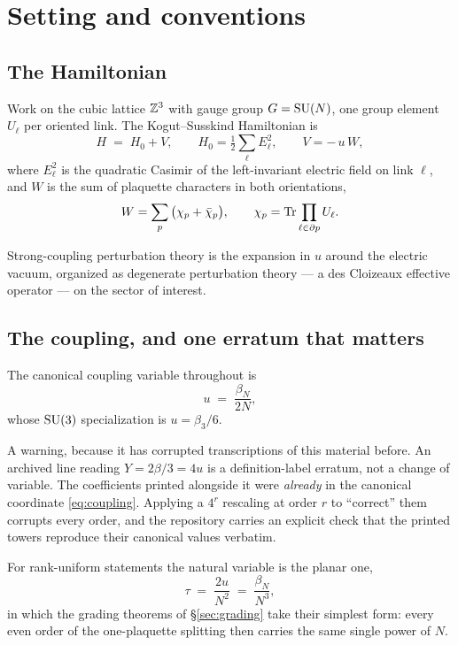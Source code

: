 \section{Setting and conventions}
\label{sec:setting}

\subsection{The Hamiltonian}

Work on the cubic lattice $\mathbb{Z}^3$ with gauge group $G = \mathrm{SU}(N)$, one
group element $U_\ell$ per oriented link. The Kogut--Susskind
Hamiltonian is
\begin{equation}
  H \;=\; H_0 + V,
  \qquad
  H_0 = \tfrac12 \sum_{\ell} E_\ell^2,
  \qquad
  V = -\,u\, W,
  \label{eq:KS}
\end{equation}
where $E_\ell^2$ is the quadratic Casimir of the left-invariant electric
field on link $\ell$, and $W$ is the sum of plaquette characters in both
orientations,
\begin{equation}
  W = \sum_{p} \big(\chi_p + \bar\chi_p\big),
  \qquad
  \chi_p = \operatorname{Tr} \prod_{\ell \in \partial p} U_\ell .
\end{equation}

Strong-coupling perturbation theory is the expansion in $u$ around the
electric vacuum, organized as degenerate perturbation theory --- a des
Cloizeaux effective operator --- on the sector of interest.

\subsection{The coupling, and one erratum that matters}

The canonical coupling variable throughout is
\begin{equation}
  u \;=\; \frac{\beta_N}{2N},
  \label{eq:coupling}
\end{equation}
whose $\mathrm{SU}(3)$ specialization is $u = \beta_3/6$.

A warning, because it has corrupted transcriptions of this material
before. An archived line reading $Y = 2\beta/3 = 4u$ is a
definition-label erratum, not a change of variable. The coefficients
printed alongside it were \emph{already} in the canonical coordinate
\eqref{eq:coupling}. Applying a $4^r$ rescaling at order $r$ to
``correct'' them corrupts every order, and the repository carries an
explicit check that the printed towers reproduce their canonical values
verbatim.

For rank-uniform statements the natural variable is the planar one,
\begin{equation}
  \tau \;=\; \frac{2u}{N^2} \;=\; \frac{\beta_N}{N^3},
  \label{eq:tau}
\end{equation}
in which the grading theorems of \S\ref{sec:grading} take their simplest
form: every even order of the one-plaquette splitting then carries the
same single power of $N$.

